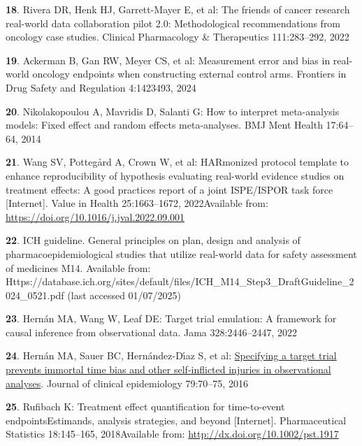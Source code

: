 \documentclass[
  letterpaper,
  DIV=11,
  numbers=noendperiod]{scrartcl}
\newlength{\cslhangindent}
\newenvironment{CSLReferences}[2] %
 {\begin{list}{}{%
  \setlength{\itemindent}{0pt}
  \setlength{\leftmargin}{0pt}
  \setlength{\parsep}{0pt}
  \ifodd #1
   \setlength{\leftmargin}{\cslhangindent}
   \setlength{\itemindent}{-1\cslhangindent}
  \fi
  \setlength{\itemsep}{#2\baselineskip}}}
 {\end{list}}
\begin{document}
\begin{CSLReferences}{0}{1}
\textbf{18}. Rivera DR, Henk HJ, Garrett-Mayer E, et al: The friends of
cancer research real-world data collaboration pilot 2.0: Methodological
recommendations from oncology case studies. Clinical Pharmacology \&
Therapeutics 111:283--292, 2022

\textbf{19}. Ackerman B, Gan RW, Meyer CS, et al: Measurement error and
bias in real-world oncology endpoints when constructing external control
arms. Frontiers in Drug Safety and Regulation 4:1423493, 2024

\textbf{20}. Nikolakopoulou A, Mavridis D, Salanti G: How to interpret
meta-analysis models: Fixed effect and random effects meta-analyses. BMJ
Ment Health 17:64--64, 2014

\textbf{21}. Wang SV, Pottegård A, Crown W, et al: HARmonized protocol
template to enhance reproducibility of hypothesis evaluating real-world
evidence studies on treatment effects: A good practices report of a
joint ISPE/ISPOR task force {[}Internet{]}. Value in Health
25:1663--1672, 2022Available from:
\url{https://doi.org/10.1016/j.jval.2022.09.001}

\textbf{22}. ICH guideline. General principles on plan, design and
analysis of pharmacoepidemiological studies that utilize real-world data
for safety assessment of medicines M14. Available from:
Https://database.ich.org/sites/default/files/ICH\_M14\_Step3\_DraftGuideline\_2024\_0521.pdf
(last accessed 01/07/2025)

\textbf{23}. Hernán MA, Wang W, Leaf DE: Target trial emulation: A
framework for causal inference from observational data. Jama
328:2446--2447, 2022

\textbf{24}. Hernán MA, Sauer BC, Hernández-Dı́az S, et al:
\href{https://doi.org/10.1016/j.jclinepi.2016.04.014}{Specifying a
target trial prevents immortal time bias and other self-inflicted
injuries in observational analyses}. Journal of clinical epidemiology
79:70--75, 2016

\textbf{25}. Rufibach K: Treatment effect quantification for
time{-}to{-}event endpoints{\textendash}Estimands, analysis strategies,
and beyond {[}Internet{]}. Pharmaceutical Statistics 18:145--165,
2018Available from: \url{http://dx.doi.org/10.1002/pst.1917}


\end{CSLReferences}
\end{document}
